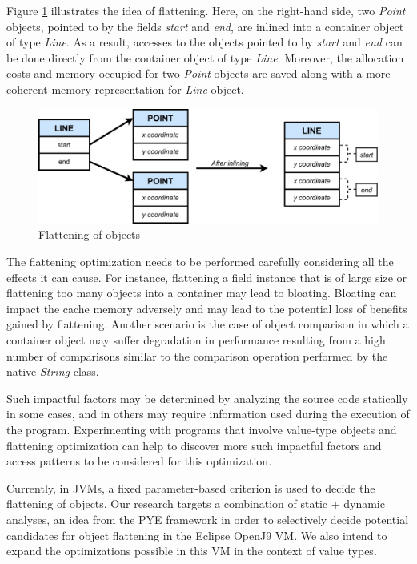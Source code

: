\documentclass[12 pt, a4paper]{article}
\begin{document}
Figure \ref{fig:Figure 1} illustrates the idea of flattening. 
Here, on the right-hand side, two {\em Point} objects, pointed to by 
the fields {\em start} and {\em end}, are inlined into a container object 
of type \textit{Line}.
As a result, accesses to the objects pointed to by {\em start} and {\em end} 
can be done directly from the container object of type {\em Line}. Moreover, 
the allocation costs and memory occupied for two {\em Point} objects are saved along
with a more coherent memory representation for {\em Line} object.

\begin{figure}[H]
	\vskip 0.2cm
	\centering
	\includegraphics[scale=0.2]{Images/Flattening_Line.jpg}
	\caption{Flattening of objects}
	\label{fig:Figure 1}
\end{figure}
The flattening optimization needs to be performed carefully considering all the effects it can cause. 
For instance, flattening a field instance that is of large size or flattening too many objects into a 
container may lead to bloating. Bloating can impact the cache memory adversely and may 
lead to the potential loss of benefits gained by flattening. Another scenario is the case of object 
comparison in which a container object may suffer degradation in performance resulting 
from a high number of comparisons similar to the comparison operation performed by the native {\em String} class. 


	Such impactful factors may be determined by analyzing the source code statically in some cases, and in others may require 
information used during the execution of the program. Experimenting with programs that involve 
value-type objects and flattening optimization 
can help to discover more such impactful factors and access patterns to be considered for this 
optimization. 

Currently, in JVMs, a fixed parameter-based criterion is used to decide the flattening of objects.
Our research targets a combination of static + dynamic analyses, an idea from the PYE framework \citep{PYE2019} in 
order to selectively decide potential candidates for object flattening in the Eclipse OpenJ9 VM.
 We also intend to expand the optimizations 
possible in this VM in the context of value types. 
\end{document}
